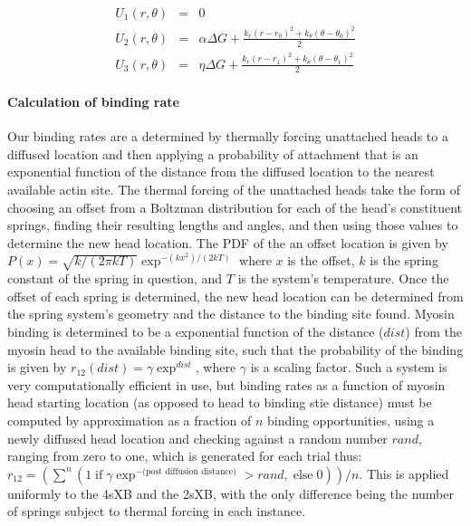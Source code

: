 \documentclass[]{article}
\begin{document}
\begin{eqnarray}
\label{2sEnergy}
	U_1(r,\theta) & = & 0 \nonumber \\
    U_2(r,\theta) & = & \alpha \Delta G + \frac{k_r (r - r_0)^2 + 
                        k_\theta (\theta - \theta_0)^2}{2} \nonumber \\
    U_3(r,\theta) & = & \eta \Delta G   + \frac{k_r (r - r_1)^2 + 
                        k_\theta (\theta - \theta_1)^2}{2} 
\end{eqnarray}


\paragraph{Calculation of binding rate} %
Our binding rates are a determined by thermally forcing unattached heads to a diffused location and then applying a probability of attachment that is an exponential function of the distance from the diffused location to the nearest available actin site.
The thermal forcing of the unattached heads take the form of choosing an offset from a Boltzman distribution for each of the head's constituent springs, finding their resulting lengths and angles, and then using those values to determine the new head location.
The PDF of the an offset location is given by  $P(x) = \sqrt{k / (2 \pi kT)} \exp^{-(k x^2)/(2 kT)}$ where $x$ is the offset, $k$ is the spring constant of the spring in question, and $T$ is the system's temperature.
Once the offset of each spring is determined, the new head location can be determined from the spring system's geometry and the distance to the binding site found.
Myosin binding is determined to be a exponential function of the distance ($dist$) from the myosin head to the available binding site, such that the probability of the binding is given by $r_{12}(dist) = \gamma \exp ^{dist}$, where $\gamma$ is a scaling factor.
Such a system is very computationally efficient in use, but binding rates as a function of myosin head starting location (as opposed to head to binding stie distance) must be computed by approximation as a fraction of $n$ binding opportunities, using a newly diffused head location and checking against a random number $rand$, ranging from zero to one, which is generated for each trial thus: 
$r_{12} = ( \sum^n ( 1\; \textrm{if}\; \gamma \exp^{-(\textrm{post diffusion distance)}}>rand ,\; \textrm{else}\; 0) )/n$.
This is applied uniformly to the 4sXB and the 2sXB, with the only difference being the number of springs subject to thermal forcing in each instance.
\end{document}
